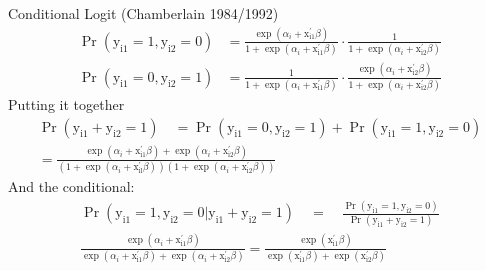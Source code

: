 \documentclass[xcolor=pdftex,dvipsnames,table,mathserif,aspectratio=169]{beamer}
\begin{document}
\begin{frame}{Conditional Logit  (Chamberlain 1984/1992)}
\footnotesize
\begin{align*}
\operatorname{Pr}\left(\mathrm{y}_{\mathrm{i} 1}=1, \mathrm{y}_{\mathrm{i} 2}=0\right) &= 
\frac{\exp \left(\alpha_i+\mathrm{x}_{\mathrm{i} 1}^{\prime} \beta\right)}{1+\exp \left(\alpha_i+\mathrm{x}_{\mathrm{i} 1}^{\prime} \beta\right)} \cdot \frac{1}{1+\exp \left(\alpha_i+\mathrm{x}_{\mathrm{i} 2}^{\prime} \beta\right)}\\
\operatorname{Pr}\left(\mathrm{y}_{\mathrm{i} 1}=0, \mathrm{y}_{\mathrm{i} 2}=1\right) &=
 \frac{1}{1+\exp \left(\alpha_i+\mathrm{x}_{\mathrm{i} 1}^{\prime} \beta\right)} \cdot \frac{\exp \left(\alpha_i+\mathrm{x}_{\mathrm{i} 2}^{\prime} \beta\right)}{1+\exp \left(\alpha_i+\mathrm{x}_{\mathrm{i} 2}^{\prime} \beta\right)}
\end{align*}
Putting it together
\begin{align*}
\operatorname{Pr}\left(\mathrm{y}_{\mathrm{i} 1}+\mathrm{y}_{\mathrm{i} 2}=1\right) \quad=\operatorname{Pr}\left(\mathrm{y}_{\mathrm{i} 1}=0, \mathrm{y}_{\mathrm{i} 2}=1\right)+\operatorname{Pr}\left(\mathrm{y}_{\mathrm{i} 1}=1, \mathrm{y}_{\mathrm{i} 2}=0\right)\\
=\frac{\exp \left(\alpha_i+\mathrm{x}_{\mathrm{i} 1}^{\prime} \beta\right)+\exp \left(\alpha_i+\mathrm{x}_{\mathrm{i} 2}^{\prime} \beta\right)}{\left(1+\exp \left(\alpha_i+\mathrm{x}_{\mathrm{il}}^{\prime} \beta\right)\right)\left(1+\exp \left(\alpha_i + \mathrm{x}_{\mathrm{i} 2}^{\prime} \beta\right)\right)}
\end{align*}
And the conditional:
\begin{align*}
\operatorname{Pr}\left(\mathrm{y}_{\mathrm{i} 1}=1, \mathrm{y}_{\mathrm{i} 2}=0 | \mathrm{y}_{\mathrm{i} 1}+\mathrm{y}_{\mathrm{i} 2}=1\right) \quad=\quad \frac{\operatorname{Pr}\left(\mathrm{y}_{\mathrm{i} 1}=1, \mathrm{y}_{\mathrm{i} 2}=0\right)}{\operatorname{Pr}\left(\mathrm{y}_{\mathrm{i} 1}+\mathrm{y}_{\mathrm{i} 2}=1\right)}\\
\frac{\exp \left(\alpha_i+\mathrm{x}_{\mathrm{i} 1}^{\prime} \beta\right)}{\exp \left(\alpha_i+\mathrm{x}_{\mathrm{i} 1}^{\prime} \beta\right)+\exp \left(\alpha_i+\mathrm{x}_{\mathrm{i} 2}^{\prime} \beta\right)}=\frac{\exp \left(\mathrm{x}_{\mathrm{i} 1}^{\prime} \beta\right)}{\exp \left(\mathrm{x}_{\mathrm{i} 1}^{\prime} \beta\right)+\exp \left(\mathrm{x}_{\mathrm{i} 2}^{\prime} \beta\right)}
\end{align*}
\end{frame}
\end{document}
